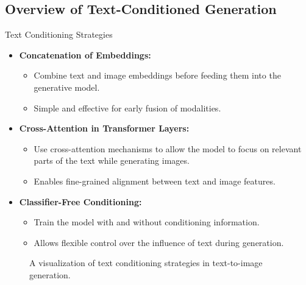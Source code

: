 \subsection{Overview of Text-Conditioned Generation}
\begin{frame}[allowframebreaks]{Text Conditioning Strategies}
    \begin{itemize}
        \item \textbf{Concatenation of Embeddings:}
        \begin{itemize}
            \item Combine text and image embeddings before feeding them into the generative model.
            \item Simple and effective for early fusion of modalities.
        \end{itemize}
        \item \textbf{Cross-Attention in Transformer Layers:}
        \begin{itemize}
            \item Use cross-attention mechanisms to allow the model to focus on relevant parts of the text while generating images.
            \item Enables fine-grained alignment between text and image features.
        \end{itemize}
        \item \textbf{Classifier-Free Conditioning:}
        \begin{itemize}
            \item Train the model with and without conditioning information.
            \item Allows flexible control over the influence of text during generation.
        \end{itemize}
    \end{itemize}
\framebreak
    \begin{figure}
        \centering
        \caption*{A visualization of text conditioning strategies in text-to-image generation.}
    \end{figure}
\end{frame}

